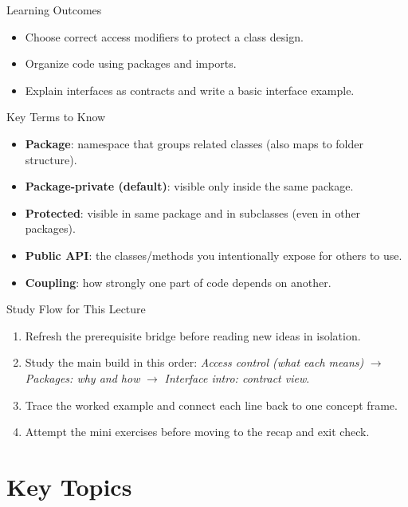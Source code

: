 \documentclass{beamer}
\begin{document}
\begin{frame}{Learning Outcomes}
  \begin{itemize}[<+->]
    \item Choose correct access modifiers to protect a class design.
    \item Organize code using packages and imports.
    \item Explain interfaces as contracts and write a basic interface example.
  \end{itemize}
  \slidesources{\OOPSUnitIISources}
\end{frame}

\begin{frame}{Key Terms to Know}
\begin{itemize}[<+->]
  \item \textbf{Package}: namespace that groups related classes (also maps to folder structure).
  \item \textbf{Package-private (default)}: visible only inside the same package.
  \item \textbf{Protected}: visible in same package and in subclasses (even in other packages).
  \item \textbf{Public API}: the classes/methods you intentionally expose for others to use.
  \item \textbf{Coupling}: how strongly one part of code depends on another.
\end{itemize}
  \slidesources{\OOPSUnitIISources}
\end{frame}

\begin{frame}{Study Flow for This Lecture}
\begin{enumerate}[<+->]
  \item Refresh the prerequisite bridge before reading new ideas in isolation.
  \item Study the main build in this order: \textit{Access control (what each means)} $\rightarrow$ \textit{Packages: why and how} $\rightarrow$ \textit{Interface intro: contract view}.
  \item Trace the worked example and connect each line back to one concept frame.
  \item Attempt the mini exercises before moving to the recap and exit check.
\end{enumerate}
  \slidesources{\OOPSUnitIISources}
\end{frame}


\section{Key Topics}
\label{sec:concepts}
\end{document}
